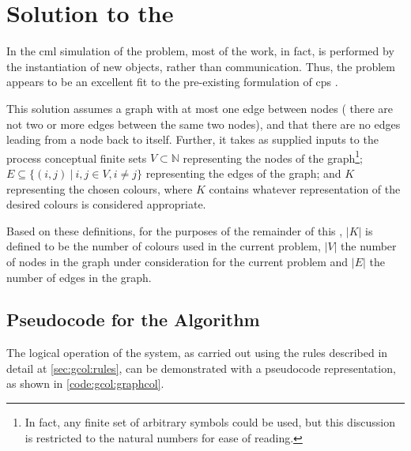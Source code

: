 \section{\label{sec:gcol:cpsys} Solution to the }
In the \gls{cml} simulation of the problem, most of the work, in fact, is performed by the instantiation of new objects, rather than communication.  Thus, the problem appears to be an excellent fit to the pre-existing formulation of \gls{cps} \cite{Nicolescu2018}.

This solution assumes a graph with at most one edge between nodes (\ie{} there are not two or more edges between the same two nodes), and that there are no edges leading from a node back to itself.  Further, it takes as supplied inputs to the process conceptual finite sets \(V \subset \mathbb{N}\) representing the nodes of the graph\footnote{In fact, any finite set of arbitrary symbols could be used, but this discussion is restricted to the natural numbers for ease of reading.}; \(E \subseteq \{(i,j)~|~i, j \in V, i \neq j \}\) representing the edges of the graph; and \(K\) representing the chosen colours, where \(K\) contains whatever representation of the desired colours is considered appropriate.

Based on these definitions, for the purposes of the remainder of this , \(|K|\) is defined to be the number of colours used in the current problem, \(|V|\) the number of nodes in the graph under consideration for the current problem and \(|E|\) the number of edges in the graph.

\subsection{Pseudocode for the  Algorithm}
The logical operation of the system, as carried out using the rules described in detail at \cref{sec:gcol:rules}, can be demonstrated with a pseudocode representation, as shown in \cref{code:gcol:graphcol}.

